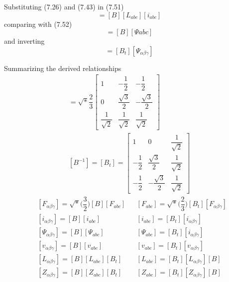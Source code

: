 \documentclass[a4paper,numbers=noenddot,12pt]{scrbook}
\begin{document}
        Substituting (7.26) and (7.43) in (7.51)
        \begin{equation*}
            [\varPsi_{\alpha \beta \gamma}] = [B][L_{abc}][i_{abc}]
        \end{equation*}
        comparing with (7.52)
        \begin{equation}
            [\varPsi_{\alpha \beta \gamma}] = [B][\varPsi{abc}]
            \label{eq:Eq7.53}
        \end{equation}
        and inverting
        \begin{equation}
            [\varPsi{abc}] = [B_t][\varPsi_{\alpha \beta \gamma}]
            \label{eq:Eq7.54}
        \end{equation}

        Summarizing the derived relationships
        \begin{multline*}
            [B] = \sqrt*{\dfrac{2}{3}} 
            \begin{bmatrix}
                1 & - \dfrac{1}{2} & - \dfrac{1}{2} \\[2ex]
                0 & \dfrac{\sqrt{3}}{2} & - \dfrac{\sqrt{3}}{2} \\[2ex]
                \dfrac{1}{\sqrt{2}} & \dfrac{1}{\sqrt{2}} & \dfrac{1}{\sqrt{2}}
            \end{bmatrix} \\
            [B^{-1}] = [B_t] = 
            \begin{bmatrix}
                1 & 0 & \dfrac{1}{\sqrt{2}} \\[2ex]
                - \dfrac{1}{2} & \dfrac{\sqrt{3}}{2} & \dfrac{1}{\sqrt{2}} \\[2ex]
                - \dfrac{1}{2} & - \dfrac{\sqrt{3}}{2} & \dfrac{1}{\sqrt{2}}
            \end{bmatrix}
            \label{}
        \end{multline*}
        \begin{equation}
            \begin{aligned}
                &[F_{\alpha \beta \gamma}] = \sqrt*{\Big( \dfrac{3}{2}\Big)} [B] [F_{abc}] && [F_{abc}] = \sqrt*{\Big(\dfrac{2}{3}\Big)}[B_t][F_{\alpha \beta \gamma}] \\
                &[i_{\alpha \beta \gamma}] =[B][i_{abc}] && [i_{abc}] = [B_t][i_{\alpha \beta \gamma}] \\
                & [\varPsi_{\alpha \beta \gamma}] = [B][\varPsi_{abc}] && [\varPsi_{abc}] = [B_t][i_{\alpha \beta \gamma}] \\
                &[v_{\alpha \beta \gamma}] = [B][v_{abc}] && [v_{abc}] = [B_t][v_{\alpha \beta\gamma}] \\
                & [L_{\alpha \beta \gamma}] = [B][L_{abc}][B_t] && [L_{abc}] = [B_t][L_{\alpha \beta \gamma}][B] \\
                & [Z_{\alpha \beta \gamma}] = [B][Z_{abc}][B_t] && [Z_{abc}] = [B_t][Z_{\alpha \beta \gamma}][B]
            \end{aligned}
            \label{eq:Eq7.55}
        \end{equation}
\end{document}

